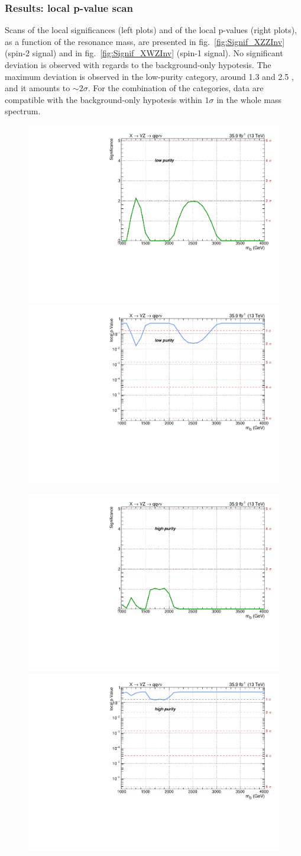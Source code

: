 \subsubsection{Results: local p-value scan}
Scans of the local significances (left plots) and of the local p-values (right plots), as a function of the resonance mass, are presented in fig.~\ref{fig:Signif_XZZInv} (spin-2 signal) and in fig.~\ref{fig:Signif_XWZInv} (spin-1 signal). No significant deviation is observed with regards to the background-only hypotesis. The maximum deviation is observed in the low-purity category, around 1.3 and 2.5 \TeV, and it amounts to $\sim 2 \sigma$. For the combination of the categories, data are compatible with the background-only hypotesis within $1 \sigma$ in the whole mass spectrum.

\begin{figure}[!htb]
  \begin{center}
     \includegraphics[width=.495\textwidth]{plotsAlpha_tesi/Limits/Significance_XZZInv_XVZnnlp.pdf}%
     \includegraphics[width=.495\textwidth]{plotsAlpha_tesi/Limits/pValue_XZZInv_XVZnnlp.pdf}

     \includegraphics[width=.495\textwidth]{plotsAlpha_tesi/Limits/Significance_XZZInv_XVZnnhp.pdf}%
     \includegraphics[width=.495\textwidth]{plotsAlpha_tesi/Limits/pValue_XZZInv_XVZnnhp.pdf}


\end{center}
\end{figure}
